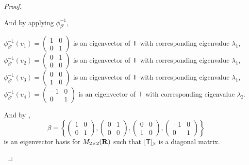 \begin{proof}
\begin{enumerate}
And by applying \(\phi_{\beta'}^{-1}\),
\begin{center}
    \(\phi_{\beta'}^{-1}(v_1) = \begin{pmatrix} 1 & 0 \\ 0 & 1 \end{pmatrix}\) is an eigenvector of \(\textsf{T}\) with corresponding eigenvalue \(\lambda_1\), \\
    \(\phi_{\beta'}^{-1}(v_2) = \begin{pmatrix} 0 & 1 \\ 0 & 0 \end{pmatrix}\) is an eigenvector of \(\textsf{T}\) with corresponding eigenvalue \(\lambda_1\), \\
    \(\phi_{\beta'}^{-1}(v_3) = \begin{pmatrix} 0 & 0 \\ 1 & 0 \end{pmatrix}\) is an eigenvector of \(\textsf{T}\) with corresponding eigenvalue \(\lambda_1\), \\
    \(\phi_{\beta'}^{-1}(v_4) = \begin{pmatrix} -1 & 0 \\ 0 & 1 \end{pmatrix}\) is an eigenvector of \(\textsf{T}\) with corresponding eigenvalue \(\lambda_2\).
\end{center}
And by ,
\[
    \beta = \left\{
        \begin{pmatrix} 1 & 0 \\ 0 & 1 \end{pmatrix},
        \begin{pmatrix} 0 & 1 \\ 0 & 0 \end{pmatrix},
        \begin{pmatrix} 0 & 0 \\ 1 & 0 \end{pmatrix},
        \begin{pmatrix} -1 & 0 \\ 0 & 1 \end{pmatrix}
    \right\}
\]
is an eigenvector basis for \(M_{2 \times 2}(\mathbf{R})\) such that \([\textsf{T}]_{\beta}\) is a diagonal matrix.


\end{enumerate}
\end{proof}
